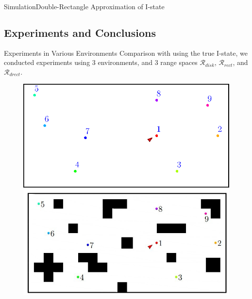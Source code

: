 \begin{frame}{Simulation}{Double-Rectangle Approximation of I-state}
  \begin{center}
  \end{center}
\end{frame} 


\subsection[Experiments]{Experiments and Conclusions}
\begin{frame}{Experiments in Various Environments}
  Comparison with using the true I-state, we conducted experiments using 3
  environments, and 3 range spaces $\mathcal{R}_{disk}$, $\mathcal{R}_{rect}$,
  and  $\mathcal{R}_{drect}$. \\
  \begin{figure}
  \centering
  \begin{minipage}[b]{0.45\textwidth}
    \includegraphics[scale=0.45]{figs/blank}  \\ 
    \includegraphics[scale=0.45]{figs/clutter}  

\end{minipage}
\end{figure}
\end{frame}
